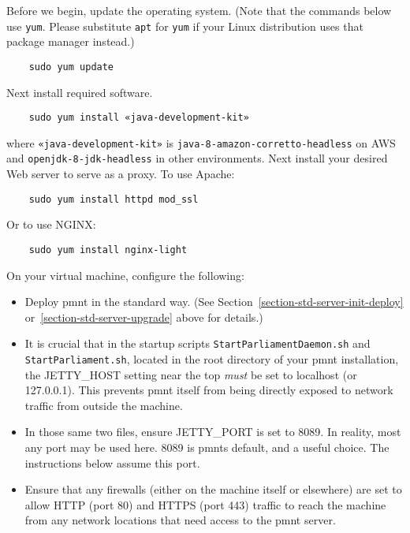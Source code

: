 Before we begin, update the operating system.  (Note that the commands below use \texttt{yum}.  Please substitute \texttt{apt} for \texttt{yum} if your Linux distribution uses that package manager instead.)

\begin{Verbatim}
	sudo yum update
\end{Verbatim}

Next install required software.

\begin{Verbatim}
	sudo yum install «java-development-kit»
\end{Verbatim}

where \texttt{«java-development-kit»} is \texttt{java-8-amazon-corretto-headless} on AWS and \texttt{openjdk-8-jdk-headless} in other environments.  Next install your desired Web server to serve as a proxy.  To use Apache:

\begin{Verbatim}
	sudo yum install httpd mod_ssl
\end{Verbatim}

Or to use NGINX:

\begin{Verbatim}
	sudo yum install nginx-light
\end{Verbatim}

On your virtual machine, configure the following:

\begin{itemize}
	\item Deploy \ac{pmnt} in the standard way.  (See Section~\ref{section-std-server-init-deploy} or~\ref{section-std-server-upgrade} above for details.)

	\item It is crucial that in the startup scripts \texttt{StartParliamentDaemon.sh} and \texttt{StartParliament.sh}, located in the root directory of your \ac{pmnt} installation, the JETTY\_HOST setting near the top \emph{must} be set to localhost (or 127.0.0.1).  This prevents \ac{pmnt} itself from being directly exposed to network traffic from outside the machine.

	\item In those same two files, ensure JETTY\_PORT is set to 8089.  In reality, most any port may be used here.  8089 is \acp{pmnt} default, and a useful choice.  The instructions below assume this port.

	\item Ensure that any firewalls (either on the machine itself or elsewhere) are set to allow HTTP (port 80) and HTTPS (port 443) traffic to reach the machine from any network locations that need access to the \ac{pmnt} server.
\end{itemize}

